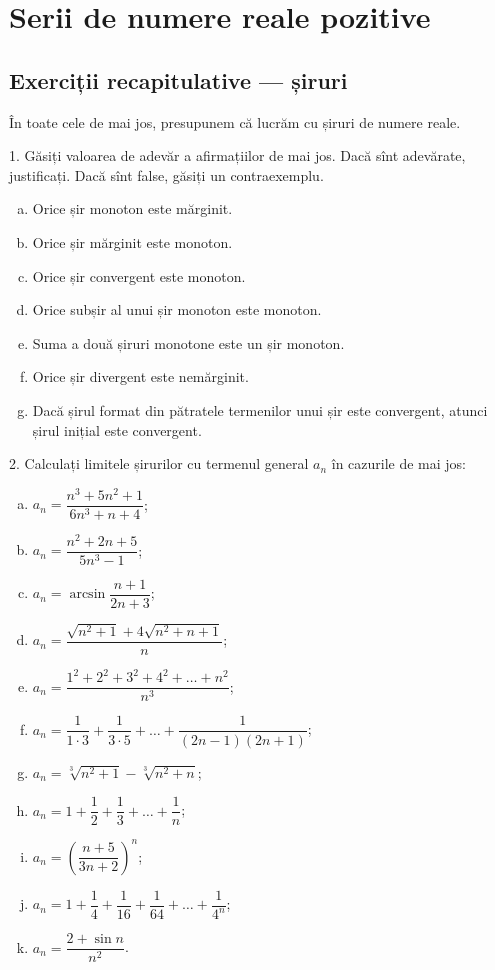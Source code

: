 \chapter{Serii de numere reale pozitive}

\section{Exerciții recapitulative --- șiruri}

În toate cele de mai jos, presupunem că lucrăm cu șiruri de numere reale.

\vspace{1cm}

1. Găsiți valoarea de adevăr a afirmațiilor de mai jos. Dacă sînt adevărate,
justificați. Dacă sînt false, găsiți un contraexemplu.
\begin{enumerate}[(a)]
    \item Orice șir monoton este mărginit.
    \item Orice șir mărginit este monoton.
    \item Orice șir convergent este monoton.
    \item Orice subșir al unui șir monoton este monoton.
    \item Suma a două șiruri monotone este un șir monoton.
    \item Orice șir divergent este nemărginit.
    \item Dacă șirul format din pătratele termenilor unui șir este convergent,
        atunci șirul inițial este convergent.
\end{enumerate}

\vspace{1cm}

2. Calculați limitele șirurilor cu termenul general $ a_n $ în cazurile de mai jos:
\begin{enumerate}[(a)]
    \item $ a_n = \dfrac{n^3 + 5n^2 + 1}{6n^3 + n + 4} $;
    \item $ a_n = \dfrac{n^2 + 2n + 5}{5n^3 - 1} $;
    \item $ a_n = \arcsin \dfrac{n + 1}{2n + 3} $;
    \item $ a_n = \dfrac{\sqrt{n^2 + 1} + 4\sqrt{n^2 + n + 1}}{n} $;
    \item $ a_n = \dfrac{1^2 + 2^2 + 3^2 + 4^2 + \dots + n^2}{n^3} $;
    \item $ a_n = \dfrac{1}{1 \cdot 3} + \dfrac{1}{3 \cdot 5} + \dots + \dfrac{1}{(2n - 1)(2n + 1)} $;
    \item $ a_n = \sqrt[3]{n^2 + 1} - \sqrt[3]{n^2 + n} $;
    \item $ a_n = 1 + \dfrac{1}{2} + \dfrac{1}{3} + \dots + \dfrac{1}{n} $;
    \item $ a_n = \left( \dfrac{n+5}{3n + 2} \right)^n $;
    \item $ a_n = 1 + \dfrac{1}{4} + \dfrac{1}{16} + \dfrac{1}{64} + \dots + \dfrac{1}{4^n} $;
    \item $ a_n = \dfrac{2 + \sin n}{n^2} $.
\end{enumerate}

